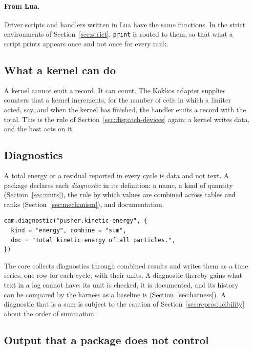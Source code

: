 \documentclass[11pt,a4paper]{article}
\newcommand{\code}[1]{\texttt{#1}}
\begin{document}
\paragraph{From Lua.}  Driver scripts and handlers written in Lua have the
same functions.  In the strict environments of Section~\ref{sec:strict},
\code{print} is routed to them, so that what a script prints appears once
and not once for every rank.

\subsection{What a kernel can do}

A kernel cannot emit a record.  It can count.  The Kokkos adapter supplies
counters that a kernel increments, for the number of cells in which a
limiter acted, say, and when the kernel has finished, the handler emits a
record with the total.  This is the rule of
Section~\ref{sec:dispatch-devices} again: a kernel writes data, and the host
acts on it.

\subsection{Diagnostics}

A total energy or a residual reported in every cycle is data and not text.
A package declares each \emph{diagnostic} in its definition: a name, a kind
of quantity (Section~\ref{sec:units}), the rule by which values are
combined across tables and ranks (Section~\ref{sec:mechanism}), and
documentation.

\begin{lstlisting}[language={[5.3]Lua}]
cam.diagnostic("pusher.kinetic-energy", {
  kind = "energy", combine = "sum",
  doc = "Total kinetic energy of all particles.",
})
\end{lstlisting}

The core collects diagnostics through combined results and writes them as a
time series, one row for each cycle, with their units.  A diagnostic
thereby gains what text in a log cannot have: its unit is checked, it is
documented, and its history can be compared by the harness as a baseline is
(Section~\ref{sec:harness}).  A diagnostic that is a sum is subject to the
caution of Section~\ref{sec:reproducibility} about the order of summation.

\subsection{Output that a package does not control}
\end{document}
